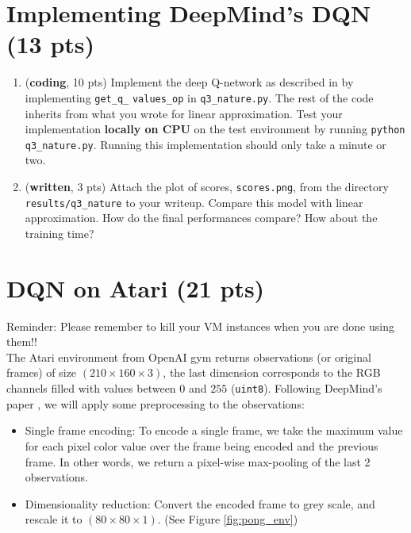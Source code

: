 \documentclass{article}
\newenvironment{myitemize}
{ \begin{itemize}
		\setlength{\itemsep}{0pt}
		\setlength{\parskip}{0pt}
		\setlength{\parsep}{0pt}     }
	{ \end{itemize}                  }
\begin{document}
\section{Implementing DeepMind's DQN (13 pts)}

\begin{enumerate}

\item (\textbf{coding}, 10 pts) Implement the deep Q-network as described in \cite{mnih2015human} by implementing \texttt{get\_q\_} \texttt{values\_op} in \texttt{q3\_nature.py}. The rest of the code inherits from what you wrote for linear approximation. Test your implementation \textbf{locally on CPU} on the test environment by running \texttt{python q3\_nature.py}.  Running this implementation should only take a minute or two.

\item (\textbf{written}, 3 pts) Attach the plot of scores, \texttt{scores.png}, from the directory \texttt{results/q3\_nature} to your writeup. Compare this model with linear approximation. How do the final performances compare? How about the training time?
\end{enumerate}

\section{DQN on Atari (21 pts)}

Reminder: Please remember to kill your VM instances when you are done using them!! \\

The Atari environment from OpenAI gym returns observations (or original frames) of size $ (210 \times 160 \times 3) $, the last dimension corresponds to the RGB channels filled with values between $ 0 $ and $ 255 $ (\texttt{uint8}). Following DeepMind's paper \cite{mnih2015human}, we will apply some preprocessing to the observations:
\begin{myitemize}
\item Single frame encoding: To encode a single frame, we take the maximum value for each pixel color value over the frame being encoded and the previous frame. In other words, we return a pixel-wise max-pooling of the last 2 observations.
\item Dimensionality reduction: Convert the encoded frame to grey scale, and rescale it to $(80 \times 80 \times 1)$. (See Figure \ref{fig:pong_env})
\end{myitemize}
\end{document}
